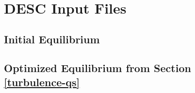 \documentclass{jpp}
\begin{document}
\newpage

\section{DESC Input Files}
\subsection{Initial Equilibrium}


\subsection{Optimized Equilibrium from Section \ref{turbulence-qs}}


\end{document}
